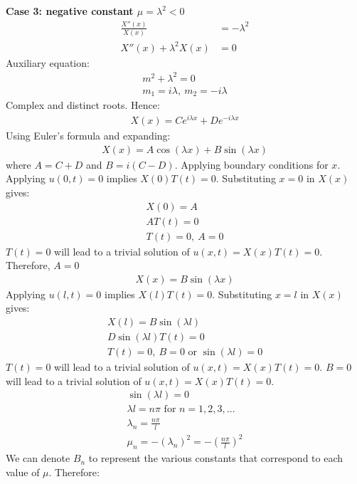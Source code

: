 \documentclass[11pt]{article}
\numberwithin{equation}{section}
\begin{document}
\textbf{Case 3: negative constant $\mu = \lambda^2 < 0$}
\begin{align}
	\frac{X''\left(x\right)}{X\left(x\right)} &= -\lambda^2\\
	X''\left(x\right) + \lambda^2X\left(x\right) &= 0 
\end{align}
Auxiliary equation:
\begin{gather}
	m^2 + \lambda^2 = 0\\
	m_1 = i\lambda, \ m_2 = -i\lambda
\end{gather}
Complex and distinct roots. Hence:
\begin{align}
	X(x) = Ce^{i\lambda x} + De^{-i\lambda x}
\end{align}
Using Euler's formula and expanding:
\begin{align}
	X(x) = A\cos\left(\lambda x\right) + B\sin\left(\lambda x\right)
\end{align}
where $A = C +D$ and $B = i\left(C-D\right)$. Applying boundary conditions for $x$. Applying $u(0,t) = 0$ implies $X(0)T(t) = 0$. Substituting $x=0$ in $X(x)$ gives:
\begin{gather}
	X(0) = A\\
	AT(t) = 0\\
	T(t) = 0, \ A = 0
\end{gather}
$T(t) = 0$ will lead to a trivial solution of $u(x,t) = X(x)T(t) = 0$. Therefore, $A = 0$
\begin{align}
	X(x) = B\sin\left(\lambda x\right)
\end{align}
Applying $u(l,t) = 0$ implies $X(l)T(t) = 0$. Substituting $x=l$ in $X(x)$ gives:
\begin{gather}
	X(l) = B\sin\left(\lambda l\right)\\
	D\sin\left(\lambda l\right)T(t) = 0\\
	T(t) = 0, \ B = 0 \textrm{ or } \sin\left(\lambda l\right) = 0
\end{gather}
$T(t) = 0$ will lead to a trivial solution of $u(x,t) = X(x)T(t) = 0$. $B=0$ will lead to a trivial solution of $u(x,t) = X(x)T(t) = 0$. 
\begin{gather}
	\sin\left(\lambda l\right) = 0\\
	\lambda l = n\pi \textrm{ for } n = 1,2,3,...\\
	\lambda_n = \frac{n\pi}{l}\\
	\mu_n = -\left(\lambda_n\right)^2 = -\left(\frac{n\pi}{l}\right)^2
\end{gather}
We can denote $B_n$ to represent the various constants that correspond to each value of $\mu$. Therefore:
\end{document}
